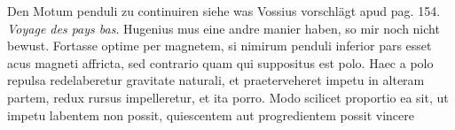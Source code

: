                 \vspace*{8mm}
                \pstart 
                \normalsize \noindent
            [60~r\textsuperscript{o}] Den Motum penduli zu continuiren siehe was Vossius\protect{} vorschl\"{a}gt apud pag. 154. \textit{Voyage des pays bas}.\protect{} Hugenius\protect{} mus eine andre  manier haben, so mir noch nicht bewust. Fortasse optime per magnetem\protect{}, si nimirum penduli\protect{} inferior  pars esset acus magneti\protect{} affricta, sed contrario quam qui suppositus est polo. Haec a polo repulsa redelaberetur gravitate\protect{} naturali, et praeterveheret impetu in alteram partem, redux  rursus impelleretur, et ita porro. Modo scilicet proportio ea sit, ut impetu labentem non possit, quiescentem aut progredientem possit vincere 
